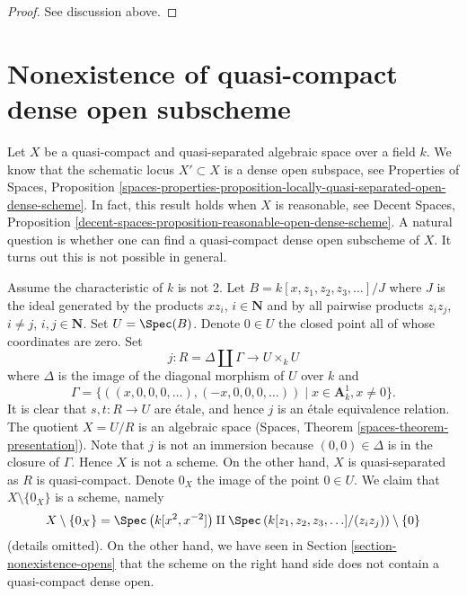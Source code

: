 \begin{proof}
See discussion above.
\end{proof}







\section{Nonexistence of quasi-compact dense open subscheme}
\label{section-nonexistence-qc-dense-open-subscheme}

\noindent
Let $X$ be a quasi-compact and quasi-separated algebraic space over a field
$k$. We know that the schematic locus $X' \subset X$ is a dense open
subspace, see
Properties of Spaces, Proposition
\ref{spaces-properties-proposition-locally-quasi-separated-open-dense-scheme}.
In fact, this result holds when $X$ is reasonable, see
Decent Spaces, Proposition
\ref{decent-spaces-proposition-reasonable-open-dense-scheme}.
A natural question is whether one can find a quasi-compact dense
open subscheme of $X$. It turns out this is not possible in general.

\medskip\noindent
Assume the characteristic of $k$ is not 2.
Let $B = k[x, z_1, z_2, z_3, \ldots]/J$ where $J$ is the ideal generated by
the products $xz_i$, $i \in \mathbf{N}$ and by all pairwise products
$z_iz_j$, $i \not = j$, $i, j \in \mathbf{N}$. Set $U = \Spec(B)$.
Denote $0 \in U$ the closed point all of whose coordinates are zero.
Set
$$
j : R = \Delta \amalg \Gamma \longrightarrow U \times_k U
$$
where $\Delta$ is the image of the diagonal morphism of $U$ over $k$ and
$$
\Gamma = \{((x, 0, 0, 0, \ldots), (-x, 0, 0, 0, \ldots))
\mid x \in \mathbf{A}^1_k, x \not = 0\}.
$$
It is clear that $s, t : R \to U$ are \'etale, and hence
$j$ is an \'etale equivalence relation. The quotient $X = U/R$
is an algebraic space (Spaces, Theorem \ref{spaces-theorem-presentation}).
Note that $j$ is not an immersion because
$(0, 0) \in \Delta$ is in the closure of $\Gamma$.
Hence $X$ is not a scheme. On the other hand, $X$ is quasi-separated
as $R$ is quasi-compact. Denote $0_X$ the image of the point $0 \in U$.
We claim that $X \setminus \{0_X\}$ is a scheme, namely
$$
X \setminus \{0_X\} =
\Spec\left(k[x^2, x^{-2}]\right) \amalg
\Spec\left(k[z_1, z_2, z_3, \ldots]/(z_iz_j)\right) \setminus \{0\}
$$
(details omitted). On the other hand, we have seen in
Section \ref{section-nonexistence-opens} that the scheme
on the right hand side does not contain
a quasi-compact dense open.

